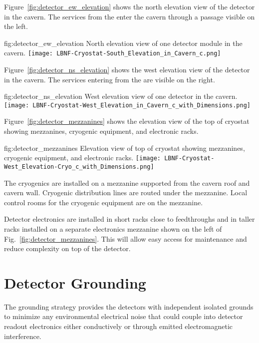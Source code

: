 Figure~\ref{fig:detector_ew_elevation} shows the north
elevation view of the detector in the cavern. The services from the
 enter the cavern through a passage visible on the left.
\begin{dunefigure}{fig:detector_ew_elevation}
  {North elevation view of one detector module in the cavern.}
  \texttt{[image: LBNF-Cryostat-South\_Elevation\_in\_Cavern\_c.png]}
\end{dunefigure}

Figure~\ref{fig:detector_ns_elevation} shows the west
elevation view of the detector in the cavern. The services entering
from the  are visible on the right.
\begin{dunefigure}{fig:detector_ns_elevation}
  {West elevation view of one detector in the cavern.}
  \texttt{[image: LBNF-Cryostat-West\_Elevation\_in\_Cavern\_c\_with\_Dimensions.png]}
\end{dunefigure}

Figure~\ref{fig:detector_mezzanines} shows the elevation view of the
top of cryostat showing mezzanines, cryogenic equipment, and
electronic racks.
\begin{dunefigure}{fig:detector_mezzanines}
  {Elevation view of top of cryostat showing mezzanines, cryogenic
    equipment, and electronic racks.}
  \texttt{[image: LBNF-Cryostat-West\_Elevation-Cryo\_c\_with\_Dimensions.png]}
\end{dunefigure}
The cryogenics are installed on a mezzanine supported from
the cavern roof and cavern wall. Cryogenic distribution lines are
routed under the mezzanine. Local control rooms for the
cryogenic equipment are on the mezzanine.

Detector electronics are installed in short racks close to
feedthroughs and in taller racks installed on a separate electronics
mezzanine shown on the left of Fig.~\ref{fig:detector_mezzanines}.
This will allow easy access for maintenance and reduce complexity on
top of the detector.

\section{Detector Grounding}
\label{sec:fdsp-coord-faci-grounding}


The grounding strategy provides the detectors with independent
isolated grounds to minimize any environmental electrical noise that
could couple into detector readout electronics either conductively or
through emitted electromagnetic interference.

